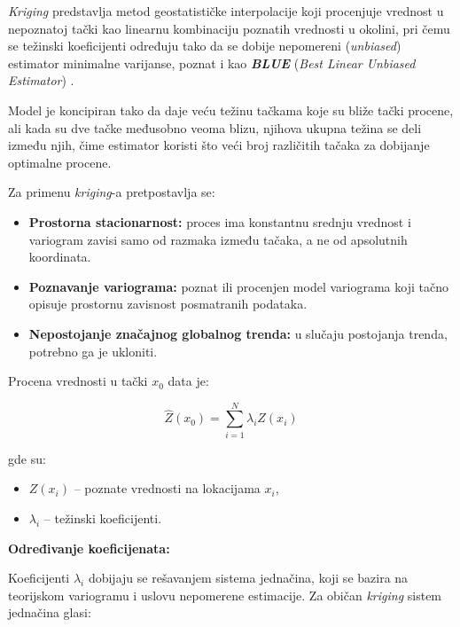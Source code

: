 \documentclass[12pt]{article}
\begin{document}
\textit{Kriging} predstavlja metod geostatističke interpolacije koji procenjuje vrednost u nepoznatoj tački kao linearnu kombinaciju poznatih vrednosti u okolini, pri čemu se težinski koeficijenti određuju tako da se dobije nepomereni (\textit{unbiased}) estimator minimalne varijanse, poznat i kao \textbf{\textit{BLUE}} (\textit{Best Linear Unbiased Estimator}) \cite{cressie1993statistics, isaaks1989applied}.

Model je koncipiran tako da daje veću težinu tačkama koje su bliže tački procene, ali kada su dve tačke međusobno veoma blizu, njihova ukupna težina se deli između njih, čime estimator koristi što veći broj različitih tačaka za dobijanje optimalne procene.

Za primenu \textit{kriging}-a pretpostavlja se:

\begin{itemize}
\item \textbf{Prostorna stacionarnost:} proces ima konstantnu srednju vrednost i variogram zavisi samo od razmaka između tačaka, a ne od apsolutnih koordinata.
\item \textbf{Poznavanje variograma:} poznat ili procenjen model variograma koji tačno opisuje prostornu zavisnost posmatranih podataka.
\item \textbf{Nepostojanje značajnog globalnog trenda:} u slučaju postojanja trenda, potrebno ga je ukloniti.
\end{itemize}

Procena vrednosti u tački $x_0$ data je:

\begin{equation}
\hat{Z}(x_0) = \sum_{i=1}^{N} \lambda_i Z(x_i)
\end{equation}

gde su:
\begin{itemize}
    \item $Z(x_i)$ -- poznate vrednosti na lokacijama $x_i$,
    \item $\lambda_i$ -- težinski koeficijenti.
\end{itemize}

\textbf{Određivanje koeficijenata:}

Koeficijenti $\lambda_i$ dobijaju se rešavanjem sistema jednačina, koji se bazira na teorijskom variogramu i uslovu nepomerene estimacije. Za običan \textit{kriging} sistem jednačina glasi:
\end{document}
